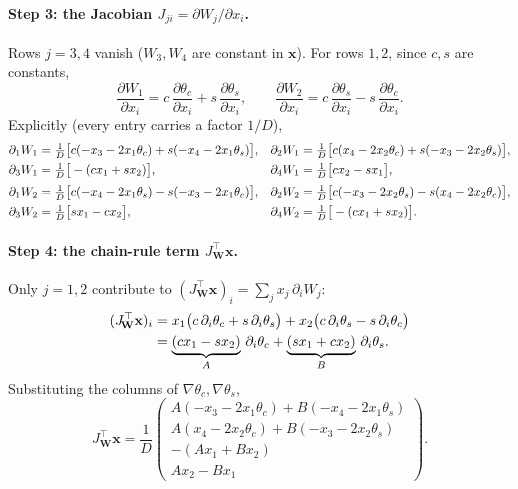 \documentclass[11pt]{article}
\newcommand{\vx}{\mathbf{x}}
\newcommand{\vW}{\mathbf{W}}
\newcommand{\grad}{\nabla}
\begin{document}
\paragraph{Step 3: the Jacobian $J_{ji}=\partial W_j/\partial x_i$.}
Rows $j=3,4$ vanish ($W_3,W_4$ are constant in $\vx$). For rows $1,2$, since
$c,s$ are constants,
\begin{equation}
  \frac{\partial W_1}{\partial x_i}=c\,\frac{\partial\theta_c}{\partial x_i}+s\,\frac{\partial\theta_s}{\partial x_i},
  \qquad
  \frac{\partial W_2}{\partial x_i}=c\,\frac{\partial\theta_s}{\partial x_i}-s\,\frac{\partial\theta_c}{\partial x_i}.
\end{equation}
Explicitly (every entry carries a factor $1/D$),
\begin{align}
  \partial_1 W_1 &= \tfrac1D\big[c(-x_3-2x_1\theta_c)+s(-x_4-2x_1\theta_s)\big], &
  \partial_2 W_1 &= \tfrac1D\big[c(x_4-2x_2\theta_c)+s(-x_3-2x_2\theta_s)\big],\notag\\
  \partial_3 W_1 &= \tfrac1D\big[-(cx_1+sx_2)\big], &
  \partial_4 W_1 &= \tfrac1D\big[cx_2-sx_1\big],\\[2pt]
  \partial_1 W_2 &= \tfrac1D\big[c(-x_4-2x_1\theta_s)-s(-x_3-2x_1\theta_c)\big], &
  \partial_2 W_2 &= \tfrac1D\big[c(-x_3-2x_2\theta_s)-s(x_4-2x_2\theta_c)\big],\notag\\
  \partial_3 W_2 &= \tfrac1D\big[sx_1-cx_2\big], &
  \partial_4 W_2 &= \tfrac1D\big[-(cx_1+sx_2)\big].
\end{align}

\paragraph{Step 4: the chain-rule term $J_{\!\vW}^{\top}\vx$.}
Only $j=1,2$ contribute to $(J_{\!\vW}^{\top}\vx)_i=\sum_j x_j\,\partial_i W_j$:
\begin{align}
  (J_{\!\vW}^{\top}\vx)_i
    &= x_1\big(c\,\partial_i\theta_c+s\,\partial_i\theta_s\big)
      +x_2\big(c\,\partial_i\theta_s-s\,\partial_i\theta_c\big)\notag\\
    &= \underbrace{(cx_1-sx_2)}_{A}\,\partial_i\theta_c
      +\underbrace{(sx_1+cx_2)}_{B}\,\partial_i\theta_s .
\end{align}
Substituting the columns of $\grad\theta_c,\grad\theta_s$,
\begin{equation}
  J_{\!\vW}^{\top}\vx=\frac1D
  \begin{pmatrix}
    A(-x_3-2x_1\theta_c)+B(-x_4-2x_1\theta_s)\\[2pt]
    A(x_4-2x_2\theta_c)+B(-x_3-2x_2\theta_s)\\[2pt]
    -(Ax_1+Bx_2)\\[2pt]
    Ax_2-Bx_1
  \end{pmatrix}.
\end{equation}
\end{document}
